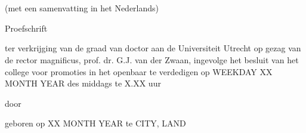 \thispagestyle{empty}
{}

\vspace*{2cm}

\begin{addmargin}[1.5cm]{1.5cm}
\begin{center}
{\LARGE\myTitle}\\\medskip
{\large \mySubtitle}\\
\vspace*{1.5cm}
\end{center}
\end{addmargin}

\centerline{\large\myDutchTitle}
\centerline{\large\myDutchSubtitle}
\bigskip
\centerline{(met een samenvatting in het Nederlands)}

\vfill

\centerline{\large Proefschrift}
\vspace*{1cm}
ter verkrijging van de graad van doctor aan de Universiteit Utrecht op gezag van de rector magnificus, prof. dr. G.J. van der Zwaan, ingevolge het besluit van het college voor promoties in het openbaar te verdedigen op WEEKDAY XX MONTH YEAR des middags te X.XX uur\\[2cm]
\centerline{door}
\vfill
\centerline{\LARGE\myName}
\bigskip
\centerline{geboren op XX MONTH YEAR te CITY, LAND}
